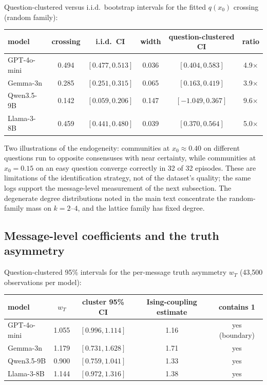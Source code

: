 \documentclass[11pt]{article}
\begin{document}
Question-clustered versus i.i.d.\ bootstrap intervals for the fitted
$q(x_0)$ crossing (random family):

\begin{center}
\begin{tabular}{lccccc}
\toprule
model & crossing & i.i.d.\ CI & width & question-clustered CI & ratio \\
\midrule
GPT-4o-mini & 0.494 & $[0.477, 0.513]$ & 0.036 & $[0.404, 0.583]$ & 4.9$\times$ \\
Gemma-3n    & 0.285 & $[0.251, 0.315]$ & 0.065 & $[0.163, 0.419]$ & 3.9$\times$ \\
Qwen3.5-9B  & 0.142 & $[0.059, 0.206]$ & 0.147 & $[-1.049, 0.367]$ & 9.6$\times$ \\
Llama-3-8B  & 0.459 & $[0.441, 0.480]$ & 0.039 & $[0.370, 0.564]$ & 5.0$\times$ \\
\bottomrule
\end{tabular}
\end{center}

Two illustrations of the endogeneity: communities at $x_0 \approx 0.40$ on
different questions run to opposite consensuses with near certainty, while
communities at $x_0 = 0.15$ on an easy question converge correctly in 32 of
32 episodes. These are limitations of the identification strategy, not of
the dataset's quality; the same logs support the message-level measurement
of the next subsection. The degenerate degree distributions noted in the
main text concentrate the random-family mass on $k = 2$--$4$, and the
lattice family has fixed degree.

\subsection{Message-level coefficients and the truth asymmetry}

Question-clustered 95\% intervals for the per-message truth asymmetry $w_T$
(43{,}500 observations per model):

\begin{center}
\begin{tabular}{lcccc}
\toprule
model & $w_T$ & cluster 95\% CI & Ising-coupling estimate & contains 1 \\
\midrule
GPT-4o-mini & 1.055 & $[0.996, 1.114]$ & 1.16 & yes (boundary) \\
Gemma-3n    & 1.179 & $[0.731, 1.628]$ & 1.71 & yes \\
Qwen3.5-9B  & 0.900 & $[0.759, 1.041]$ & 1.33 & yes \\
Llama-3-8B  & 1.144 & $[0.972, 1.316]$ & 1.38 & yes \\
\bottomrule
\end{tabular}
\end{center}
\end{document}
